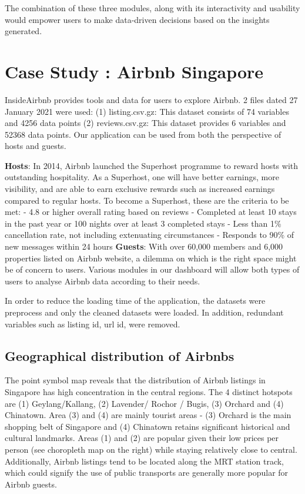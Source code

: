 \documentclass{acm_proc_article-sp}
\begin{document}
The combination of these three modules, along with its interactivity and
usability would empower users to make data-driven decisions based on the
insights generated.

\hypertarget{case-study-airbnb-singapore}{%
\section{Case Study : Airbnb
Singapore}\label{case-study-airbnb-singapore}}

InsideAirbnb provides tools and data for users to explore Airbnb. 2
files dated 27 January 2021 were used: (1) listing.csv.gz: This dataset
consists of 74 variables and 4256 data points (2) reviews.csv.gz: This
dataset provides 6 variables and 52368 data points. Our application can
be used from both the perspective of hosts and guests.

\textbf{Hosts}: In 2014, Airbnb launched the Superhost programme to
reward hosts with outstanding hospitality. As a Superhost, one will have
better earnings, more visibility, and are able to earn exclusive rewards
such as increased earnings compared to regular hosts. To become a
Superhost, these are the criteria to be met: - 4.8 or higher overall
rating based on reviews - Completed at least 10 stays in the past year
or 100 nights over at least 3 completed stays - Less than 1\%
cancellation rate, not including extenuating circumstances - Responds to
90\% of new messages within 24 hours \textbf{Guests}: With over 60,000
members and 6,000 properties listed on Airbnb website, a dilemma on
which is the right space might be of concern to users. Various modules
in our dashboard will allow both types of users to analyse Airbnb data
according to their needs.

In order to reduce the loading time of the application, the datasets
were preprocess and only the cleaned datasets were loaded. In addition,
redundant variables such as listing id, url id, were removed.

\hypertarget{geographical-distribution-of-airbnbs}{%
\subsection{Geographical distribution of
Airbnbs}\label{geographical-distribution-of-airbnbs}}

The point symbol map reveals that the distribution of Airbnb listings in
Singapore has high concentration in the central regions. The 4 distinct
hotspots are (1) Geylang/Kallang, (2) Lavender/ Rochor / Bugis, (3)
Orchard and (4) Chinatown. Area (3) and (4) are mainly tourist areas -
(3) Orchard is the main shopping belt of Singapore and (4) Chinatown
retains significant historical and cultural landmarks. Areas (1) and (2)
are popular given their low prices per person (see choropleth map on the
right) while staying relatively close to central. Additionally, Airbnb
listings tend to be located along the MRT station track, which could
signify the use of public transports are generally more popular for
Airbnb guests.
\end{document}
